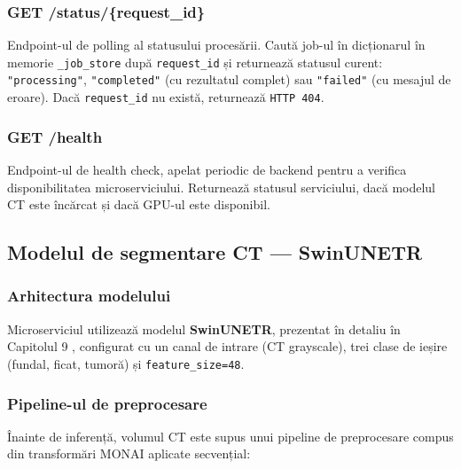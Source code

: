 \documentclass[12pt, a4paper]{report}
\begin{document}
\subsubsection{GET /status/\{request\_id\}}

Endpoint-ul de polling al statusului procesării. Caută job-ul în dicționarul
în memorie \texttt{\_job\_store} după \texttt{request\_id} și returnează statusul
curent: \texttt{"processing"}, \texttt{"completed"} (cu rezultatul complet) sau
\texttt{"failed"} (cu mesajul de eroare). Dacă \texttt{request\_id} nu există,
returnează \texttt{HTTP 404}.

\subsubsection{GET /health}

Endpoint-ul de health check, apelat periodic de backend pentru a verifica
disponibilitatea microserviciului. Returnează statusul serviciului, dacă modelul
CT este încărcat și dacă GPU-ul este disponibil.

\subsection{Modelul de segmentare CT --- SwinUNETR}

\subsubsection{Arhitectura modelului}

Microserviciul utilizează modelul \textbf{SwinUNETR}, prezentat în detaliu în
Capitolul 9 , configurat cu un canal de intrare (CT grayscale),
trei clase de ieșire (fundal, ficat, tumoră) și \texttt{feature\_size=48}.

\subsubsection{Pipeline-ul de preprocesare}

Înainte de inferență, volumul CT este supus unui pipeline de preprocesare compus
din transformări MONAI aplicate secvențial:
\end{document}
